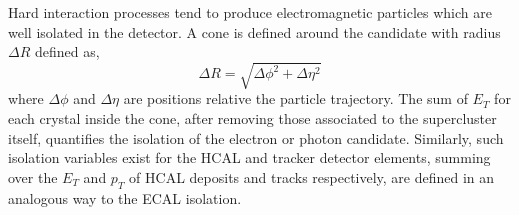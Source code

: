 Hard interaction processes tend to produce electromagnetic particles which are well
isolated in the detector. A cone is defined around the candidate with radius $\Delta R$ defined as,
\begin{equation}
\Delta R = \sqrt{\Delta\phi^{2}+\Delta\eta^{2}}
\end{equation}
where $\Delta\phi$ and $\Delta\eta$ are positions relative the particle trajectory.
The sum of $E_{T}$ for each crystal inside the cone, after removing those associated 
to the supercluster itself, quantifies the isolation of the electron or photon candidate.
Similarly, such isolation variables exist for the HCAL and tracker detector elements,
summing over the $E_{T}$ and $p_{T}$ of HCAL deposits and tracks respectively,
are defined in an analogous way to the ECAL isolation.

